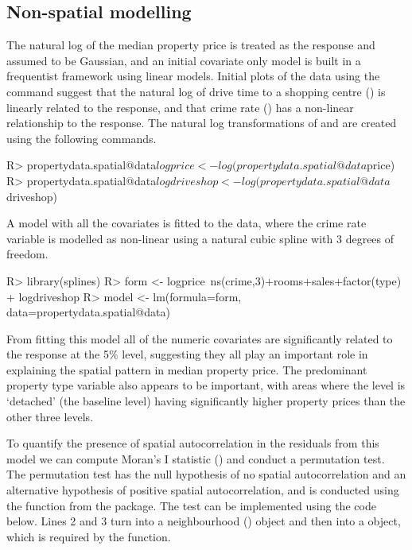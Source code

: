 \documentclass[article,shortnames,nojss]{jss}
\begin{document}
\subsection{Non-spatial modelling}
The natural log of the median property price is treated as the response and assumed to be Gaussian, and an initial covariate only model is built in a frequentist framework using linear models. Initial plots of the data using the  command suggest that the natural log of  drive time to a shopping centre () is linearly related to the response, and that crime rate () has a non-linear relationship to the response. The natural log transformations of  and  are created using the following commands.

\begin{Schunk}
\begin{Sinput}
R> propertydata.spatial@data$logprice <- log(propertydata.spatial@data$price)
R> propertydata.spatial@data$logdriveshop <- log(propertydata.spatial@data$driveshop)
\end{Sinput}
\end{Schunk}
    
A model with all the covariates is fitted to the data, where the crime rate variable is modelled as non-linear using a natural cubic spline with 3 degrees of freedom.
    
\begin{Schunk}
\begin{Sinput}
R> library(splines)
R> form <- logprice~ns(crime,3)+rooms+sales+factor(type) + logdriveshop
R> model <- lm(formula=form, data=propertydata.spatial@data)
\end{Sinput}
\end{Schunk}
    
From fitting this model all of the numeric covariates are significantly related to the response at the 5$\%$ level, suggesting they all play an important role in explaining the spatial pattern in median property price. The predominant property type variable also appears to be important, with areas where the level is `detached' (the baseline level) having significantly higher property prices than the other three levels. 

\hspace{1cm} To quantify the presence of spatial autocorrelation in the residuals from this model we can compute Moran's I statistic (\citealp{moran1950}) and conduct a permutation test. The permutation test has the null hypothesis of no spatial autocorrelation and an alternative hypothesis of positive spatial autocorrelation, and is conducted using the  function from the  package. The test can be implemented using the code below. Lines 2 and 3 turn  into a neighbourhood () object and then into a  object, which is required by the  function.
\end{document}
